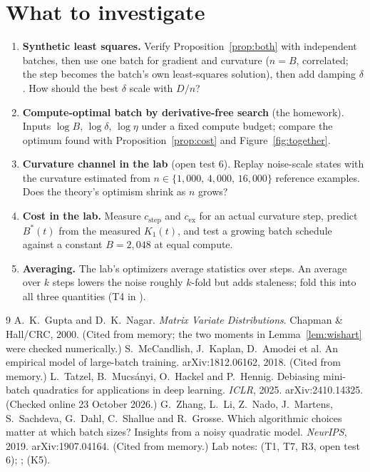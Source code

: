 \documentclass[11pt,a4paper]{article}
\theoremstyle{plain}
\theoremstyle{definition}
\theoremstyle{remark}
\begin{document}
\section{What to investigate}\label{sec:next}

\begin{enumerate}[nosep]
\item \textbf{Synthetic least squares.} Verify Proposition~\ref{prop:both} with independent batches, then use one
  batch for gradient and curvature ($n=B$, correlated; the step becomes the batch's own least-squares solution), then
  add damping $\delta$. How should the best $\delta$ scale with $D/n$?
\item \textbf{Compute-optimal batch by derivative-free search} (the homework). Inputs $\log B$, $\log\delta$,
  $\log\eta$ under a fixed compute budget; compare the optimum found with Proposition~\ref{prop:cost} and
  Figure~\ref{fig:together}.
\item \textbf{Curvature channel in the lab} (open test 6). Replay noise-scale states with the curvature estimated
  from $n\in\{1{,}000,\,4{,}000,\,16{,}000\}$ reference examples. Does the theory's optimism shrink as $n$ grows?
\item \textbf{Cost in the lab.} Measure $c_{\mathrm{step}}$ and $c_{\mathrm{ex}}$ for an actual curvature step,
  predict $B^*(t)$ from the measured $K_1(t)$, and test a growing batch schedule against a constant $B=2{,}048$ at
  equal compute.
\item \textbf{Averaging.} The lab's optimizers average statistics over steps. An average over $k$ steps lowers the
  noise roughly $k$-fold but adds staleness; fold this into all three quantities (T4 in
  ).
\end{enumerate}

\begin{thebibliography}{9}\setlength{\itemsep}{2pt}\small
{} A.~K.~Gupta and D.~K.~Nagar. \emph{Matrix Variate Distributions}. Chapman \& Hall/CRC, 2000. (Cited
  from memory; the two moments in Lemma~\ref{lem:wishart} were checked numerically.)
 S.~McCandlish, J.~Kaplan, D.~Amodei et al. An empirical model of large-batch training.
  arXiv:1812.06162, 2018. (Cited from memory.)
 L.~Tatzel, B.~Mucs\'anyi, O.~Hackel and P.~Hennig. Debiasing mini-batch quadratics for applications in
  deep learning. \emph{ICLR}, 2025. arXiv:2410.14325. (Checked online 23 October 2026.)
 G.~Zhang, L.~Li, Z.~Nado, J.~Martens, S.~Sachdeva, G.~Dahl, C.~Shallue and R.~Grosse. Which
  algorithmic choices matter at which batch sizes? Insights from a noisy quadratic model. \emph{NeurIPS}, 2019.
  arXiv:1907.04164. (Cited from memory.)
 Lab notes:  (T1, T7, R3, open test 6);
  ;  (K5).
\end{thebibliography}
\end{document}
